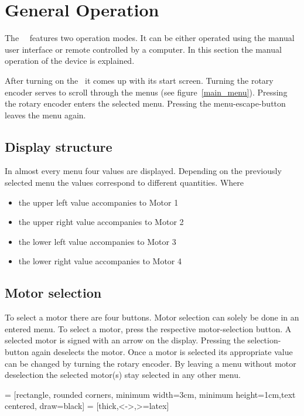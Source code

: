 \section{General Operation}
The \productNumber ~\productName ~features two operation modes. It can be
either operated using the manual user interface or remote controlled by a
computer. In this section the manual operation of the device is explained.

After turning on the \productName ~it comes up with its start screen.
Turning the rotary encoder serves to scroll through the menus (see
figure~\ref{main_menu}). Pressing the rotary encoder enters the selected
menu. Pressing the menu-escape-button leaves the menu again.

\subsection{Display structure}
In almost every menu four values are displayed. Depending on the previously
selected menu the values correspond to different quantities. Where
\begin{itemize}
  \item the upper left value accompanies to Motor 1
  \item the upper right value accompanies to Motor 2
  \item the lower left value accompanies to Motor 3
  \item the lower right value accompanies to Motor 4
\end{itemize}

\subsection{Motor selection}
To select a motor there are four buttons. Motor selection can solely be
done in an entered menu. To select a motor, press the respective motor-selection
button. A selected motor is signed with an arrow on the display. Pressing the
selection-button again deselects the motor. Once a motor is selected its
appropriate value can be changed by turning the rotary encoder. By leaving
a menu without motor deselection the selected motor(s) stay selected in any
other menu.

 = [rectangle, rounded corners, minimum width=3cm, minimum height=1cm,text centered, draw=black]
 = [thick,<->,>=latex]
\def \textWidth {7cm}

